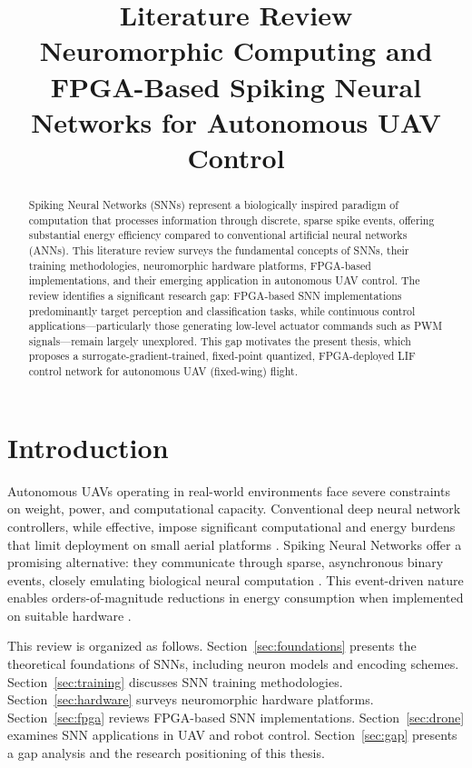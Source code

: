 \documentclass[12pt,a4paper]{article}
\title{\textbf{Literature Review}\\[0.3em]
\large Neuromorphic Computing and FPGA-Based Spiking Neural Networks for Autonomous UAV Control}
\author{}
\date{}
\begin{document}
\maketitle

\begin{abstract}
\noindent
Spiking Neural Networks (SNNs) represent a biologically inspired paradigm of computation that processes information through discrete, sparse spike events, offering substantial energy efficiency compared to conventional artificial neural networks (ANNs). This literature review surveys the fundamental concepts of SNNs, their training methodologies, neuromorphic hardware platforms, FPGA-based implementations, and their emerging application in autonomous UAV control. The review identifies a significant research gap: FPGA-based SNN implementations predominantly target perception and classification tasks, while continuous control applications---particularly those generating low-level actuator commands such as PWM signals---remain largely unexplored. This gap motivates the present thesis, which proposes a surrogate-gradient-trained, fixed-point quantized, FPGA-deployed LIF control network for autonomous UAV (fixed-wing) flight.
\end{abstract}

\section{Introduction}
Autonomous UAVs operating in real-world environments face severe constraints on weight, power, and computational capacity. Conventional deep neural network controllers, while effective, impose significant computational and energy burdens that limit deployment on small aerial platforms \cite{Paredes2024}. Spiking Neural Networks offer a promising alternative: they communicate through sparse, asynchronous binary events, closely emulating biological neural computation \cite{Schuman2017}. This event-driven nature enables orders-of-magnitude reductions in energy consumption when implemented on suitable hardware \cite{Merolla2014,Davies2018}.

This review is organized as follows. Section~\ref{sec:foundations} presents the theoretical foundations of SNNs, including neuron models and encoding schemes. Section~\ref{sec:training} discusses SNN training methodologies. Section~\ref{sec:hardware} surveys neuromorphic hardware platforms. Section~\ref{sec:fpga} reviews FPGA-based SNN implementations. Section~\ref{sec:drone} examines SNN applications in UAV and robot control. Section~\ref{sec:gap} presents a gap analysis and the research positioning of this thesis.
\end{document}
